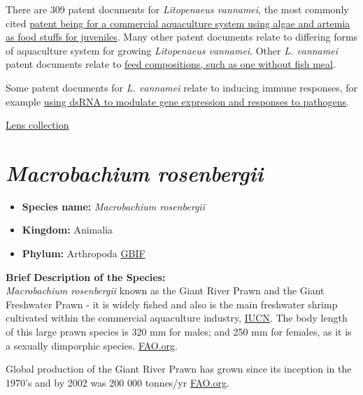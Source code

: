 \documentclass[]{book}
\providecommand{\tightlist}{%
  \setlength{\itemsep}{0pt}\setlength{\parskip}{0pt}}
\theoremstyle{definition}
\theoremstyle{definition}
\theoremstyle{definition}
\theoremstyle{remark}
\begin{document}
There are 309 patent documents for \emph{Litopenaeus vannamei}, the most
commonly cited
\href{https://www.lens.org/lens/patent/US_6615767_B1}{patent being for a
commercial aquaculture system using algae and artemia as food stuffs for
juveniles}. Many other patent documents relate to differing forms of
aquaculture system for growing \emph{Litopenaeus vannamei}. Other
\emph{L. vannamei} patent documents relate to
\href{https://www.lens.org/lens/patent/CN_102648738_A}{feed
compositions, such as one without fish meal}.

Some patent documents for \emph{L. vannamei} relate to inducing immune
responses, for example
\href{https://www.lens.org/lens/patent/US_2005_0080032_A1}{using dsRNA
to modulate gene expression and responses to pathogens}.

\href{https://www.lens.org/lens/collection/24984}{Lens collection}

\hypertarget{macrobachium-rosenbergii}{%
\section{\texorpdfstring{\emph{Macrobachium
rosenbergii}}{Macrobachium rosenbergii}}\label{macrobachium-rosenbergii}}

\begin{itemize}
\tightlist
\item
  \textbf{Species name:} \emph{Macrobachium rosenbergii}\\
\item
  \textbf{Kingdom:} Animalia\\
\item
  \textbf{Phylum:} Arthropoda
  \href{https://www.gbif.org/species/2224546}{GBIF}
\end{itemize}

\textbf{Brief Description of the Species:}\\
\emph{Macrobachium rosenbergii} known as the Giant River Prawn and the
Giant Freshwater Prawn - it is widely fished and also is the main
freshwater shrimp cultivated within the commercial aquaculture industry,
\href{http://www.iucnredlist.org/details/197873/0}{IUCN}. The body
length of this large prawn species is 320 mm for males; and 250 mm for
females, as it is a sexually dimporphic species.
\href{http://www.fao.org/fishery/culturedspecies/Macrobrachium_rosenbergii/en}{FAO.org}.

Global production of the Giant River Prawn has grown since its inception
in the 1970's and by 2002 was 200 000 tonnes/yr
\href{http://www.fao.org/fishery/culturedspecies/Macrobrachium_rosenbergii/en}{FAO.org}.
\end{document}
